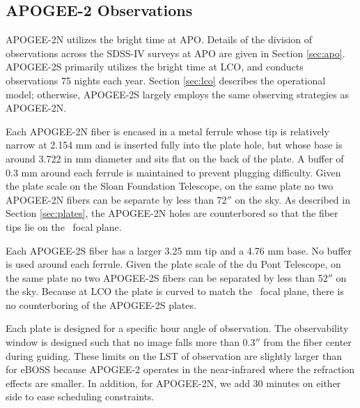 \clearpage
\subsection{APOGEE-2 Observations}
\label{sec:apogee2:observations}

APOGEE-2N utilizes the bright time at APO. Details of the division of
observations across the SDSS-IV surveys at APO are given in Section
\ref{sec:apo}. APOGEE-2S primarily utilizes the bright time at
LCO, and conducts observations 75 nights each year. Section
\ref{sec:lco} describes the operational model; otherwise, APOGEE-2S
largely employs the same observing strategies as APOGEE-2N. 

Each APOGEE-2N fiber is encased in a metal ferrule whose tip is
relatively narrow at 2.154 mm and is inserted fully into the plate
hole, but whose base is around 3.722 in mm diameter and sits flat on
the back of the plate.  A buffer of 0.3 mm around each ferrule is
maintained to prevent plugging difficulty. Given the plate scale on
the Sloan Foundation Telescope, on the same plate no two APOGEE-2N
fibers can be separate by less than 72$''$ on the sky. As described in
Section \ref{sec:plates}, the APOGEE-2N holes are counterbored so that
the fiber tips lie on the \Hband\ focal plane.

Each APOGEE-2S fiber has a larger 3.25 mm tip and a 4.76 mm base. No
buffer is used around each ferrule. Given the plate scale of the du
Pont Telescope, on the same plate no two APOGEE-2S fibers can be
separated by less than 52$''$ on the sky. Because at LCO the plate is
curved to match the \Hband\ focal plane, there is no counterboring of
the APOGEE-2S plates.

Each plate is designed for a specific hour angle of observation.  The
observability window is designed such that no image falls more than
0.3$''$ from the fiber center during guiding.  These limits on the
LST of observation are slightly larger than for eBOSS because APOGEE-2
operates in the near-infrared where the refraction effects are
smaller. In addition, for APOGEE-2N, we add 30 minutes on either side
to ease scheduling constraints.



